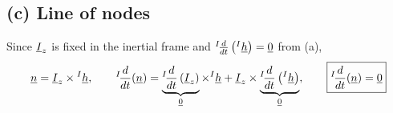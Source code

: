 \subsection*{(c) Line of nodes}

Since $\underline{I}_z$ is fixed in the inertial frame and ${}^{I}\!\frac{d}{dt}\left({}^{I}\underline{h}\right)=\underline{0}$ from (a),
\begin{equation}
\underline{n} = \underline{I}_z\times{}^{I}\underline{h}, \qquad
{}^{I}\!\frac{d}{dt}(\underline{n}) = \underbrace{{}^{I}\!\frac{d}{dt}\left(\underline{I}_z\right)}_{\underline{0}}\times{}^{I}\underline{h} + \underline{I}_z\times\underbrace{{}^{I}\!\frac{d}{dt}\left({}^{I}\underline{h}\right)}_{\underline{0}},
\qquad
\boxed{{}^{I}\!\frac{d}{dt}(\underline{n}) = \underline{0}}
\end{equation}

\FloatBarrier
